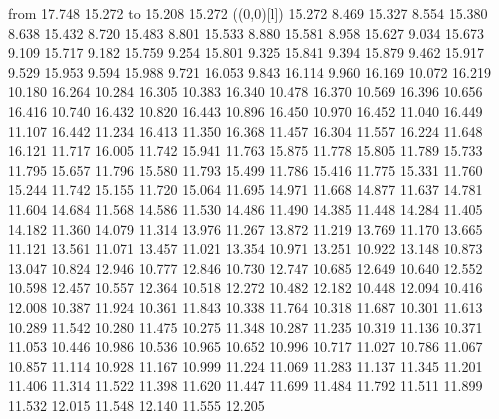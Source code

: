 {\putrule from 17.748 15.272 to 15.208 15.272
\linethickness=1pt
\setplotsymbol ({\makebox(0,0)[l]{\tencirc{}}})
%
%
 15.272      8.469 15.327
         8.554 15.380
         8.638 15.432
         8.720 15.483
         8.801 15.533
         8.880 15.581
         8.958 15.627
         9.034 15.673
         9.109 15.717
         9.182 15.759
         9.254 15.801
         9.325 15.841
         9.394 15.879
         9.462 15.917
         9.529 15.953
         9.594 15.988
         9.721 16.053
         9.843 16.114
         9.960 16.169
        10.072 16.219
        10.180 16.264
        10.284 16.305
        10.383 16.340
        10.478 16.370
        10.569 16.396
        10.656 16.416
        10.740 16.432
        10.820 16.443
        10.896 16.450
        10.970 16.452
        11.040 16.449
        11.107 16.442
        11.234 16.413
        11.350 16.368
        11.457 16.304
        11.557 16.224
        11.648 16.121
        11.717 16.005
        11.742 15.941
        11.763 15.875
        11.778 15.805
        11.789 15.733
        11.795 15.657
        11.796 15.580
        11.793 15.499
        11.786 15.416
        11.775 15.331
        11.760 15.244
        11.742 15.155
        11.720 15.064
        11.695 14.971
        11.668 14.877
        11.637 14.781
        11.604 14.684
        11.568 14.586
        11.530 14.486
        11.490 14.385
        11.448 14.284
        11.405 14.182
        11.360 14.079
        11.314 13.976
        11.267 13.872
        11.219 13.769
        11.170 13.665
        11.121 13.561
        11.071 13.457
        11.021 13.354
        10.971 13.251
        10.922 13.148
        10.873 13.047
        10.824 12.946
        10.777 12.846
        10.730 12.747
        10.685 12.649
        10.640 12.552
        10.598 12.457
        10.557 12.364
        10.518 12.272
        10.482 12.182
        10.448 12.094
        10.416 12.008
        10.387 11.924
        10.361 11.843
        10.338 11.764
        10.318 11.687
        10.301 11.613
        10.289 11.542
        10.280 11.475
        10.275 11.348
        10.287 11.235
        10.319 11.136
        10.371 11.053
        10.446 10.986
        10.536 10.965
        10.652 10.996
        10.717 11.027
        10.786 11.067
        10.857 11.114
        10.928 11.167
        10.999 11.224
        11.069 11.283
        11.137 11.345
        11.201 11.406
        11.314 11.522
        11.398 11.620
        11.447 11.699
        11.484 11.792
        11.511 11.899
        11.532 12.015
        11.548 12.140
        11.555 12.205
}
